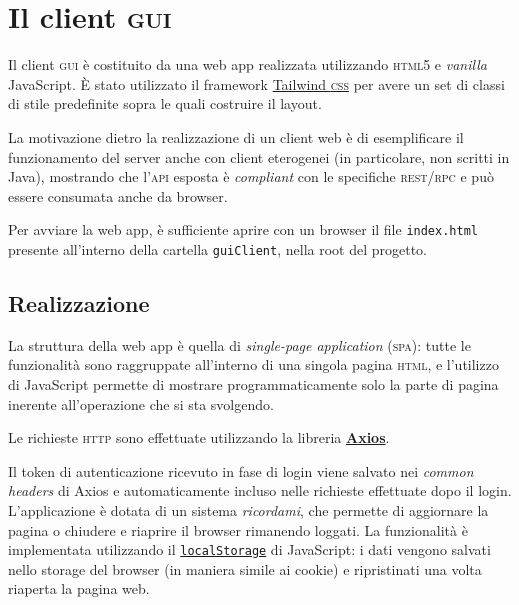 \documentclass[a4paper,8pt]{article} %
\def\code#1{\texttt{#1}}
\begin{document}
\section{Il client \textsc{gui}}
Il client \textsc{gui} è costituito da una web app realizzata utilizzando \textsc{html5} e \emph{vanilla} JavaScript.
È stato utilizzato il framework \href{https://tailwindcss.com/}{Tailwind \textsc{css}} per avere un set di classi di stile predefinite sopra le quali costruire il layout.
\par La motivazione dietro la realizzazione di un client web è di esemplificare il funzionamento del server anche con client eterogenei (in particolare, non scritti in Java), mostrando
che l'\textsc{api} esposta è \emph{compliant} con le specifiche \textsc{rest}/\textsc{rpc} e può essere consumata anche da browser.
\par Per avviare la web app, è sufficiente aprire con un browser il file \code{index.html} presente all'interno della cartella \code{guiClient}, nella root del progetto.

\subsection{Realizzazione}
La struttura della web app è quella di \emph{single-page application} (\textsc{spa}): tutte le funzionalità sono raggruppate all'interno di una singola pagina \textsc{html}, e l'utilizzo di JavaScript permette di mostrare programmaticamente
solo la parte di pagina inerente all'operazione che si sta svolgendo.
\par Le richieste \textsc{http} sono effettuate utilizzando la libreria \href{https://axios-http.com/docs/intro}{\textbf{Axios}}.
\par Il token di autenticazione ricevuto in fase di login viene salvato nei \emph{common headers} di Axios e automaticamente incluso nelle richieste effettuate dopo il login.
L'applicazione è dotata di un sistema \emph{ricordami}, che permette di aggiornare la pagina o chiudere e riaprire il browser rimanendo loggati. La funzionalità è implementata utilizzando
il \href{https://developer.mozilla.org/en-US/docs/Web/API/Window/localStorage?retiredLocale=it}{\code{localStorage}} di JavaScript: i dati vengono salvati nello storage del browser (in maniera simile ai cookie) e ripristinati
una volta riaperta la pagina web.
\end{document}
